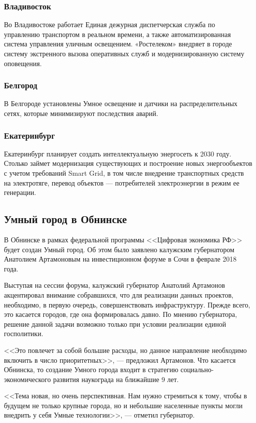 \subsubsection{Владивосток}
Во Владивостоке работает Единая дежурная диспетчерская служба по управлению транспортом в реальном времени, а также автоматизированная система управления уличным освещением. «Ростелеком» внедряет в городе систему экстренного вызова оперативных служб и модернизированную систему оповещения.
\subsubsection{Белгород}
В Белгороде установлены Умное освещение и датчики на распределительных сетях, которые минимизируют последствия аварий.
\subsubsection{Екатеринбург}
Екатеринбург планирует создать интеллектуальную энергосеть к 2030 году. Столько займет модернизация существующих и построение новых энергообъектов с учетом требований Smart Grid, в том числе внедрение транспортных средств на электротяге, перевод объектов --- потребителей электроэнергии в режим ее генерации.

\subsection{Умный город в Обнинске}
В Обнинске в рамках федеральной программы <<Цифровая экономика РФ>> будет создан Умный город. Об этом было заявлено калужским губернатором Анатолием Артамоновым на инвестиционном форуме в Сочи в феврале 2018 года.

Выступая на сессии форума, калужский губернатор Анатолий Артамонов акцентировал внимание собравшихся, что для реализации данных проектов, необходимо, в первую очередь, совершенствовать инфраструктуру. Прежде всего, это касается городов, где она формировалась давно. По мнению губернатора, решение данной задачи возможно только при условии реализации единой госполитики. 

<<Это повлечет за собой большие расходы, но данное направление необходимо включить в число приоритетных>>, --- предложил Артамонов. Что касается Обнинска, то создание Умного города входит в стратегию социально-экономического развития наукограда на ближайшие 9 лет. 

<<Тема новая, но очень перспективная. Нам нужно стремиться к тому, чтобы в будущем не только крупные города, но и небольшие населенные пункты могли внедрить у себя Умные технологии>>, --- отметил губернатор. 

